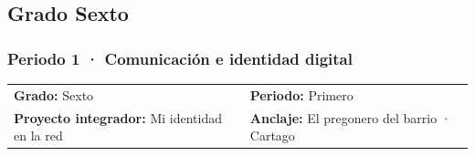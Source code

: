 \documentclass[12pt, a4paper]{article}
\renewcommand{\arraystretch}{1.4}
\begin{document}
\clearpage
\begin{landscape}
\setlength{\tabcolsep}{4pt}
\renewcommand{\arraystretch}{1.3}

\subsection{Grado Sexto}
\subsubsection{Periodo 1 · Comunicación e identidad digital}
\noindent\begin{tabular}{ll}
\textbf{Grado:} Sexto & \textbf{Periodo:} Primero \\
\textbf{Proyecto integrador:} Mi identidad en la red & \textbf{Anclaje:} El pregonero del barrio · Cartago \\
\end{tabular}
\medskip


\end{landscape}
\end{document}
